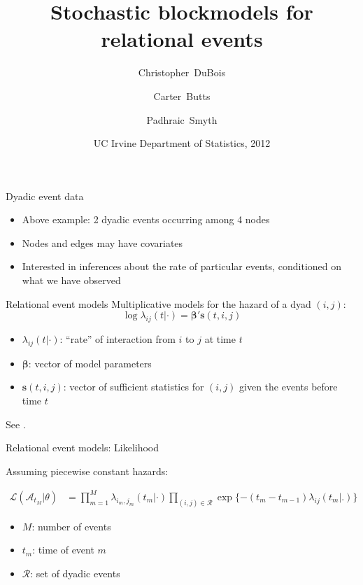 \documentclass{beamer}
\title{Stochastic blockmodels for relational events}
\author[DuBois, Christopher] %
{Christopher~DuBois\inst{1} \and Carter~Butts\inst{2} \and Padhraic~Smyth\inst{3}}
\institute[] %
{
  \inst{1}%
Department of Statistics \\
University of California, Irvine
  \and
  \inst{2}%
Department of Sociology \\
University of California, Irvine
  \and
  \inst{2}%
Department of Computer Science \\
University of California, Irvine
}
\date[Department Update 2012] %
{UC Irvine Department of Statistics, 2012}
\begin{document}
\frame{\titlepage}

\begin{frame}{Dyadic event data}
\begin{figure}
{
}
\end{figure}

\begin{itemize}
\item Above example: 2 dyadic events occurring among 4 nodes
\item Nodes and edges may have covariates
\item Interested in inferences about the rate of particular events, conditioned on what we have observed
\end{itemize}
\end{frame}

\begin{frame}{Relational event models}
Multiplicative models for the hazard of a dyad $(i,j)$:
$$\log \lambda_{ij}(t | \cdot) = \boldsymbol{\beta}' \mathbf{s}(t,i,j)$$
\begin{itemize}
\item $\lambda_{ij}(t | \cdot)$: ``rate'' of interaction from $i$ to
  $j$ at time $t$
\item $\boldsymbol{\beta}$: vector of model parameters
\item $\mathbf{s}(t,i,j)$: vector of sufficient statistics for $(i,j)$
  given the events before time $t$
\end{itemize}
\vspace{2cm}
\footnotesize{See \cite{Butts2008, Vu2011,Brandes2009,Perry2011,Stadtfeld2010,Stadtfeld2011,Opsahl2011}.}
\end{frame}

\begin{frame}{Relational event models: Likelihood}

Assuming piecewise constant hazards:

\begin{align}
\mathcal{L}(\mathcal{A}_{t_M}|\theta) &= \prod_{m=1}^M \lambda_{i_m,j_m}(t_m|\cdot) \prod_{(i,j) \in \mathcal{R}}\exp\{ - (t_m - t_{m-1}) \lambda_{ij}(t_m | .) \}
\end{align}

\begin{itemize}
\item $M$: number of events
\item $t_m$: time of event $m$
\item $\mathcal{R}$: set of dyadic events
\end{itemize}

\end{frame}
\end{document}
